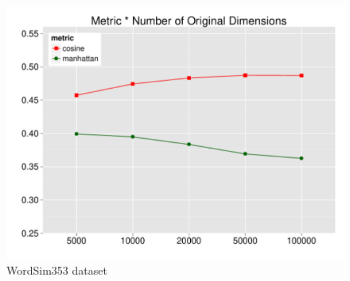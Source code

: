 \documentclass[t]{beamer} %
\begin{document}
\begin{frame}
\begin{columns}
\begin{column}{0.5\textwidth}
      \begin{figure}
        \hspace*{-18pt}   
        \includegraphics[scale=0.30]{img/lapesa_ws_main_metric_origdim}
        \vspace{-10pt}
        \caption{WordSim353 dataset}
      \end{figure}
      
    \end{column}
  \end{columns}  
  
\end{frame}
\end{document}
